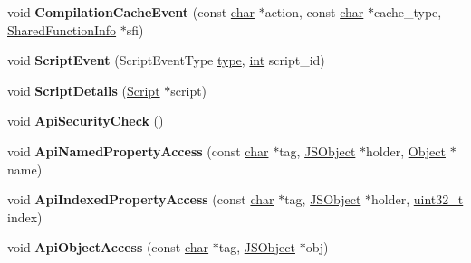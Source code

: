 \begin{DoxyCompactItemize}
\item 
\mbox{\label{classv8_1_1internal_1_1Logger_ab3d19043c118d70e48f166aa25b29b3d}} 
void {\bfseries Compilation\+Cache\+Event} (const \mbox{\hyperlink{classchar}{char}} $\ast$action, const \mbox{\hyperlink{classchar}{char}} $\ast$cache\+\_\+type, \mbox{\hyperlink{classv8_1_1internal_1_1SharedFunctionInfo}{Shared\+Function\+Info}} $\ast$sfi)
\item 
\mbox{\label{classv8_1_1internal_1_1Logger_abdb6e588475fc4bf95355f5328e06499}} 
void {\bfseries Script\+Event} (Script\+Event\+Type \mbox{\hyperlink{classstd_1_1conditional_1_1type}{type}}, \mbox{\hyperlink{classint}{int}} script\+\_\+id)
\item 
\mbox{\label{classv8_1_1internal_1_1Logger_a7e754decd24da530b9602dfca1cfde71}} 
void {\bfseries Script\+Details} (\mbox{\hyperlink{classv8_1_1internal_1_1Script}{Script}} $\ast$script)
\item 
\mbox{\label{classv8_1_1internal_1_1Logger_a0053fdf1c9ff5687fd8233140f08aafc}} 
void {\bfseries Api\+Security\+Check} ()
\item 
\mbox{\label{classv8_1_1internal_1_1Logger_aa2654b090974d25e35d51a14f90ddf06}} 
void {\bfseries Api\+Named\+Property\+Access} (const \mbox{\hyperlink{classchar}{char}} $\ast$tag, \mbox{\hyperlink{classv8_1_1internal_1_1JSObject}{J\+S\+Object}} $\ast$holder, \mbox{\hyperlink{classv8_1_1internal_1_1Object}{Object}} $\ast$name)
\item 
\mbox{\label{classv8_1_1internal_1_1Logger_afe8a98fc8134ed8a3daaa581a304986c}} 
void {\bfseries Api\+Indexed\+Property\+Access} (const \mbox{\hyperlink{classchar}{char}} $\ast$tag, \mbox{\hyperlink{classv8_1_1internal_1_1JSObject}{J\+S\+Object}} $\ast$holder, \mbox{\hyperlink{classuint32__t}{uint32\+\_\+t}} index)
\item 
\mbox{\label{classv8_1_1internal_1_1Logger_ad52311ceb7d9b9056b033850ff42f56d}} 
void {\bfseries Api\+Object\+Access} (const \mbox{\hyperlink{classchar}{char}} $\ast$tag, \mbox{\hyperlink{classv8_1_1internal_1_1JSObject}{J\+S\+Object}} $\ast$obj)

\end{DoxyCompactItemize}
